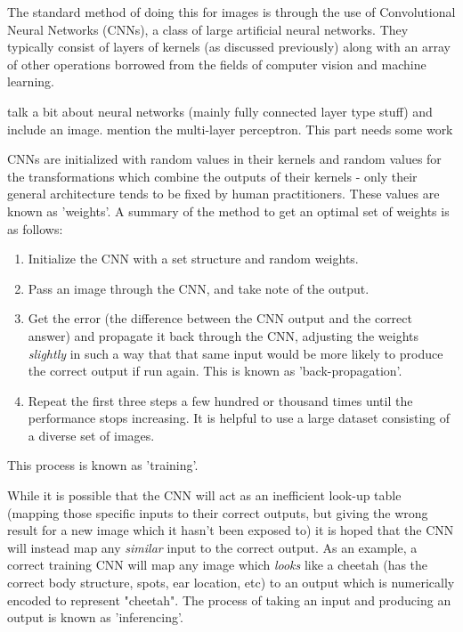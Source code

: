 The standard method of doing this for images is through the use of Convolutional Neural Networks (CNNs), a class of large artificial neural networks. They typically consist of layers of kernels (as discussed previously) along with an array of other operations borrowed from the fields of computer vision and machine learning.

{\color{red} talk a bit about neural networks (mainly fully connected layer type stuff) and include an image. mention the multi-layer perceptron. This part needs some work}

CNNs are initialized with random values in their kernels and random values for the transformations which combine the outputs of their kernels - only their general architecture tends to be fixed by human practitioners. These values are known as 'weights'. A summary of the method to get an optimal set of weights is as follows:

\begin{enumerate}
\item Initialize the CNN with a set structure and random weights.
\item Pass an image through the CNN, and take note of the output.
\item Get the error (the difference between the CNN output and the correct answer) and propagate it back through the CNN, adjusting the weights \emph{slightly} in such a way that that same input would be more likely to produce the correct output if run again. This is known as 'back-propagation'.
\item Repeat the first three steps a few hundred or thousand times until the performance stops increasing. It is helpful to use a large dataset consisting of a diverse set of images.
\end{enumerate}

This process is known as 'training'.

While it is possible that the CNN will act as an inefficient look-up table (mapping those specific inputs to their correct outputs, but giving the wrong result for a new image which it hasn't been exposed to) it is hoped that the CNN will instead map any \emph{similar} input to the correct output. As an example, a correct training CNN will map any image which \emph{looks} like a cheetah (has the correct body structure, spots, ear location, etc) to an output which is numerically encoded to represent "cheetah". The process of taking an input and producing an output is known as 'inferencing'.

